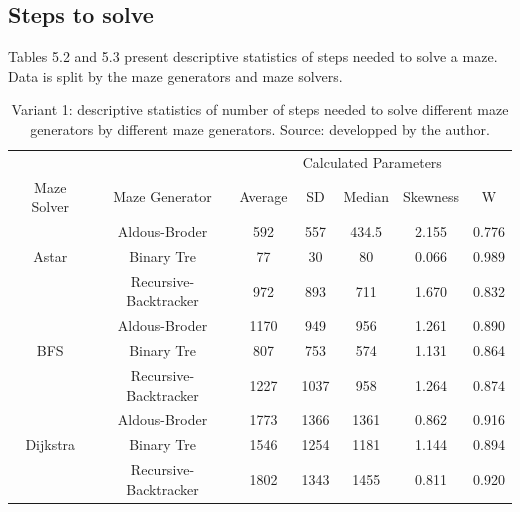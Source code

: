 \subsection{Steps to solve}
Tables 5.2 and 5.3 present descriptive statistics of steps needed to solve a maze. Data is split by the maze generators and maze solvers. 
\begin{table}[!ht]
    \centering
    \caption{Variant 1: descriptive statistics of number of steps needed to solve different maze generators by different maze generators. Source: developped by the author.} 
    \begin{tabular}{c c c c c c c}
    \hline
        ~&~&\multicolumn{5}{c}{Calculated Parameters}\\
        Maze Solver & Maze Generator & Average & SD & Median & Skewness & W\\ \hline \hline
        ~ & Aldous-Broder & 592 & 557 & 434.5 & 2.155 & 0.776\\ 
        Astar & Binary Tre & 77 & 30 & 80 & 0.066 & 0.989 \\ 
        ~ & Recursive-Backtracker & 972 & 893 & 711 & 1.670 & 0.832\\ \hline
        ~ & Aldous-Broder & 1170 & 949 & 956 & 1.261 & 0.890\\ 
        BFS & Binary Tre & 807 & 753 & 574 & 1.131 & 0.864\\ 
        ~ & Recursive-Backtracker & 1227 & 1037 & 958 & 1.264 & 0.874\\ \hline
        ~ & Aldous-Broder & 1773 & 1366 & 1361 & 0.862 & 0.916\\ 
        Dijkstra & Binary Tre & 1546 & 1254 & 1181 & 1.144 & 0.894\\ 
        ~ & Recursive-Backtracker & 1802 & 1343 & 1455 & 0.811 & 0.920\\ \hline
    \end{tabular}
\end{table}

